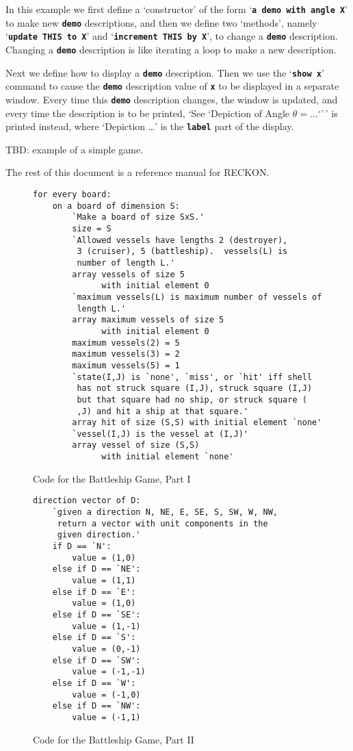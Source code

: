\documentclass[12pt]{article}
\newcommand{\TT}[1]{{\tt \bfseries #1}}
\newlength{\figurewidth}
\newenvironment{boxedfigure}[1][!btp]%
	{\begin{figure*}[#1]
	 \begin{lrbox}{\figurebox}
	 \begin{minipage}{\figurewidth}

	 \vspace*{1ex}}%
	{
	 \vspace*{1ex}

	 \end{minipage}
	 \end{lrbox}
	 \begin{center}
	 \fbox{\hspace*{0.1in}\usebox{\figurebox}\hspace*{0.1in}}
	 \end{center}
	 \end{figure*}}
\begin{document}
In this example we first define a `constructor'
of the form `\TT{a demo with angle X}' to make new \TT{demo} descriptions,
and then we define two `methods', namely `\TT{update THIS to X}' and
`\TT{in\-cre\-ment THIS by X}', to change a \TT{demo} description.  Changing
a \TT{demo} description is like iterating a loop to make a new description.

Next we define how to display a \TT{demo} description.  Then we use the
`\TT{show x}' command
to cause the \TT{demo} description value of \TT{x}
to be displayed in a separate window.
Every time this \TT{demo} description
changes, the window is updated, and every time the description
is to be printed,
`See `Depiction of Angle $\theta=\ldots^\circ$'\,'
is printed instead, where `Depiction \ldots' is the \TT{label} part of
the display.


TBD: example of a simple game.

The rest of this document is a reference manual for RECKON.

\begin{boxedfigure}

\begin{verbatim}
for every board:
    on a board of dimension S:
        `Make a board of size SxS.'
        size = S
        `Allowed vessels have lengths 2 (destroyer),
         3 (cruiser), 5 (battleship).  vessels(L) is
         number of length L.'
        array vessels of size 5
              with initial element 0
        `maximum vessels(L) is maximum number of vessels of
         length L.'
        array maximum vessels of size 5
              with initial element 0
        maximum vessels(2) = 5
        maximum vessels(3) = 2
        maximum vessels(5) = 1
        `state(I,J) is `none', `miss', or `hit' iff shell
         has not struck square (I,J), struck square (I,J)
         but that square had no ship, or struck square (
         ,J) and hit a ship at that square.'
        array hit of size (S,S) with initial element `none'
        `vessel(I,J) is the vessel at (I,J)'
        array vessel of size (S,S)
              with initial element `none'
\end{verbatim}

\caption{Code for the Battleship Game, Part I}
\label{CODE-FOR-BATTLESHIP-1}
\end{boxedfigure}


\begin{boxedfigure}

\begin{verbatim}
direction vector of D:
    `given a direction N, NE, E, SE, S, SW, W, NW,
     return a vector with unit components in the
     given direction.'
    if D == `N':
        value = (1,0)
    else if D == `NE':
        value = (1,1)
    else if D == `E':
        value = (1,0)
    else if D == `SE':
        value = (1,-1)
    else if D == `S':
        value = (0,-1)
    else if D == `SW':
        value = (-1,-1)
    else if D == `W':
        value = (-1,0)
    else if D == `NW':
        value = (-1,1)
\end{verbatim}

\caption{Code for the Battleship Game, Part II}
\label{CODE-FOR-BATTLESHIP-2}
\end{boxedfigure}
\end{document}
